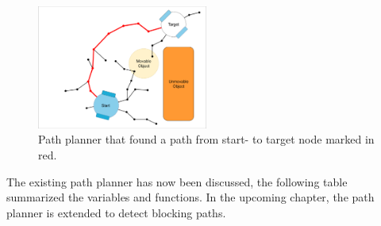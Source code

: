 \begin{figure}[H]
    \centering
    \includegraphics[width=0.5\textwidth, cfbox=my_grey 5pt 0pt]{figures/required_background/mp/7mp_path_found.drawio.png}
    \caption{Path planner that found a path from start- to target node marked in red.}
    \label{fig:motion_planner_adding_one_node_final}
\end{figure}

The existing path planner has now been discussed, the following table summarized the variables and functions. In the upcoming chapter, the path planner is extended to detect blocking paths.\bs
{}

